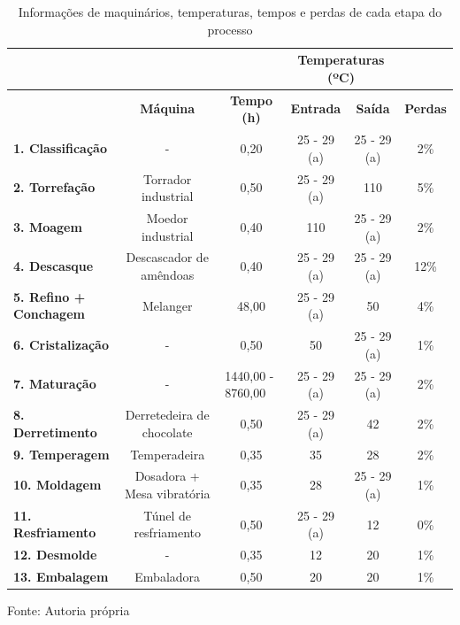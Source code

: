 \documentclass[
	12pt,				%
	openright,			%
	oneside,			%
	a4paper,			%
	english,			%
	french,				%
	spanish,			%
	brazil				%
	]{abntex2}
\begin{document}
{\fontsize{7.7}{10}\selectfont
\begin{center}
\begin{longtable}[c]{|
>{\columncolor[HTML]{EFEFEF}}l |c|c|cc|c|}
\caption{Informações de maquinários, temperaturas, tempos e perdas de cada etapa do processo}
\label{table6}\\
\hline
\multicolumn{1}{|c|}{\cellcolor[HTML]{EFEFEF}} &
  \cellcolor[HTML]{EFEFEF} &
  \cellcolor[HTML]{EFEFEF} &
  \multicolumn{2}{c|}{\cellcolor[HTML]{EFEFEF}\textbf{Temperaturas (ºC)}} &
  \cellcolor[HTML]{EFEFEF} \\ \cline{4-5}
\multicolumn{1}{|c|}{\multirow{-2}{*}{\cellcolor[HTML]{EFEFEF}\textbf{Etapas}}} &
  \multirow{-2}{*}{\cellcolor[HTML]{EFEFEF}\textbf{Máquina}} &
  \multirow{-2}{*}{\cellcolor[HTML]{EFEFEF}\textbf{Tempo (h)}} &
  \multicolumn{1}{c|}{\cellcolor[HTML]{EFEFEF}\textbf{Entrada}} &
  \cellcolor[HTML]{EFEFEF}\textbf{Saída} &
  \multirow{-2}{*}{\cellcolor[HTML]{EFEFEF}\textbf{Perdas}} \\ \hline
\endhead
%
\textbf{1. Classificação} &
  - &
  0,20 &
  \multicolumn{1}{c|}{25 - 29 (a)} &
  25 - 29 (a) &
  2\% \\ \hline
\textbf{2. Torrefação} &
  Torrador industrial &
  0,50 &
  \multicolumn{1}{c|}{25 - 29 (a)} &
  110 &
  5\% \\ \hline
\textbf{3. Moagem} &
  Moedor industrial &
  0,40 &
  \multicolumn{1}{c|}{110} &
  25 - 29 (a) &
  2\% \\ \hline
\textbf{4. Descasque} &
  Descascador de amêndoas &
  0,40 &
  \multicolumn{1}{c|}{25 - 29 (a)} &
  25 - 29 (a) &
  12\% \\ \hline
\textbf{5. Refino + Conchagem} &
  Melanger &
  48,00 &
  \multicolumn{1}{c|}{25 - 29 (a)} &
  50 &
  4\% \\ \hline
\textbf{6. Cristalização} &
  - &
  0,50 &
  \multicolumn{1}{c|}{50} &
  25 - 29 (a) &
  1\% \\ \hline
\textbf{7. Maturação} &
  - &
  \multicolumn{1}{l|}{1440,00 - 8760,00} &
  \multicolumn{1}{c|}{25 - 29 (a)} &
  25 - 29 (a) &
  2\% \\ \hline
\textbf{8. Derretimento} &
  Derretedeira de chocolate &
  0,50 &
  \multicolumn{1}{c|}{25 - 29 (a)} &
  42 &
  2\% \\ \hline
\textbf{9. Temperagem} &
  Temperadeira &
  0,35 &
  \multicolumn{1}{c|}{35} &
  28 &
  2\% \\ \hline
\textbf{10. Moldagem} &
  Dosadora + Mesa vibratória &
  0,35 &
  \multicolumn{1}{c|}{28} &
  25 - 29 (a) &
  1\% \\ \hline
\textbf{11. Resfriamento} &
  Túnel de resfriamento &
  0,50 &
  \multicolumn{1}{c|}{25 - 29 (a)} &
  12 &
  0\% \\ \hline
\textbf{12. Desmolde} &
  - &
  0,35 &
  \multicolumn{1}{c|}{12} &
  20 &
  1\% \\ \hline
\textbf{13. Embalagem} &
  Embaladora &
  0,50 &
  \multicolumn{1}{c|}{20} &
  20 &
  1\% \\ \hline
\end{longtable}
\centering \footnotesize{Fonte: Autoria própria}
\end{center}
}
\end{document}
